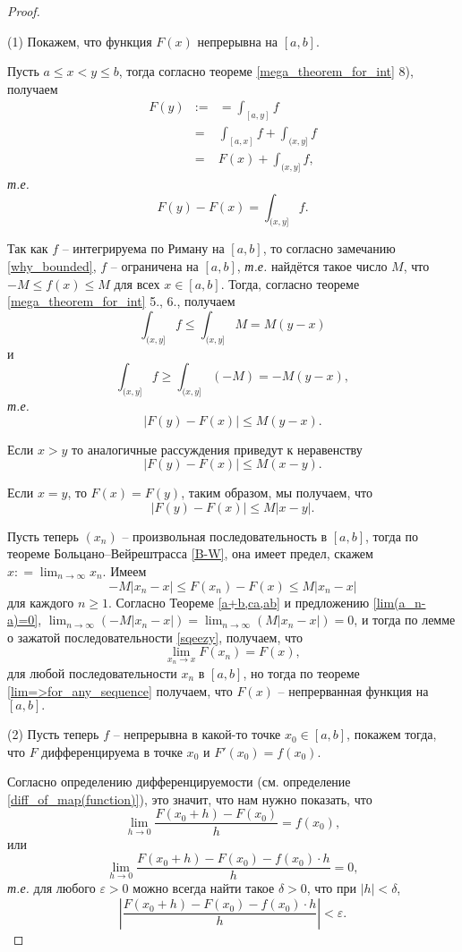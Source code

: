 \begin{proof}~

(1) Покажем, что функция $F(x)$ непрерывна на $[a,b].$

Пусть $a\le x<y \le b$, тогда согласно теореме \ref{mega_theorem_for_int} 8), получаем
\begin{eqnarray*}
 F(y) &:=& = \int_{[a,y]}f \\
 &=& \int_{[a,x]} f + \int_{(x,y]}f \\
 &=& F(x) + \int_{(x,y]}f,
\end{eqnarray*}
\textit{т.е.}
\[
 F(y) - F(x) = \int_{(x,y]}f.
\]

Так как $f$ -- интегрируема по Риману на $[a,b]$, то согласно замечанию \ref{why_bounded}, $f$ -- ограничена на $[a,b]$, \textit{т.е.} найдётся такое число $M$, что $-M \le f(x) \le M$ для всех $x \in [a,b].$ Тогда, согласно теореме \ref{mega_theorem_for_int} 5., 6., получаем
\[
 \int_{(x,y]}f \le \int_{(x,y]}M = M(y-x)
\]
и
\[
 \int_{(x,y]}f \ge \int_{(x,y]} (-M) = -M(y-x),
\]
\textit{т.е.}
\[
 |F(y) - F(x)| \le M (y-x).
\]

Если $x>y$ то аналогичные рассуждения приведут к неравенству
\[
 |F(y) - F(x)| \le M (x-y).
\]

Если $x = y$, то $F(x) = F(y)$, таким образом, мы получаем, что 
\[
 \left| F(y) - F(x) \right| \le M |x-y|.
\]

Пусть теперь $(x_n)$ -- произвольная последовательность в $[a,b]$, тогда по теореме Больцано--Вейрештрасса \ref{B-W}, она имеет предел, скажем $x: = \lim_{n\to \infty }x_n$. Имеем
\[
-M |x_n - x| \le F(x_n) - F(x) \le M|x_n-x| 
\]
для каждого $n \ge 1.$ Согласно Теореме \ref{a+b,ca,ab} и предложению \ref{lim(a_n-a)=0}, $\lim_{n\to \infty} (-M|x_n - x|) = \lim_{n\to \infty} (M|x_n - x|) = 0$, и тогда по лемме о зажатой последовательности \ref{sqeezy}, получаем, что
\[
 \lim_{x_n \to x}F(x_n) = F(x),
\]
для любой последовательности $x_n$ в $[a,b]$, но тогда по теореме \ref{lim=>for_any_sequence} получаем, что $F(x)$ -- непрерванная функция на $[a,b].$

(2) Пусть теперь $f$ -- непрерывна в какой-то точке $x_0 \in [a,b]$, покажем тогда, что $F$ дифференцируема в точке $x_0$ и $F'(x_0) = f(x_0)$. 

Согласно определению дифференцируемости (см. определение \ref{diff_of_map(function)}), это значит, что нам нужно показать, что
\[
 \lim_{h\to 0} \frac{F(x_0 + h) - F(x_0)}{h} = f(x_0),
\]
или
\[
 \lim_{h \to 0} \frac{F(x_0 + h) - F(x_0) - f(x_0)\cdot h}{h} = 0,
\]
\textit{т.е.} для любого $\varepsilon >0$ можно всегда найти такое $\delta>0$, что при $|h|<\delta$,
\[
 \left| \dfrac{F(x_0 + h) - F(x_0) - f(x_0)\cdot h}{h} \right| < \varepsilon.
\]


\end{proof}
